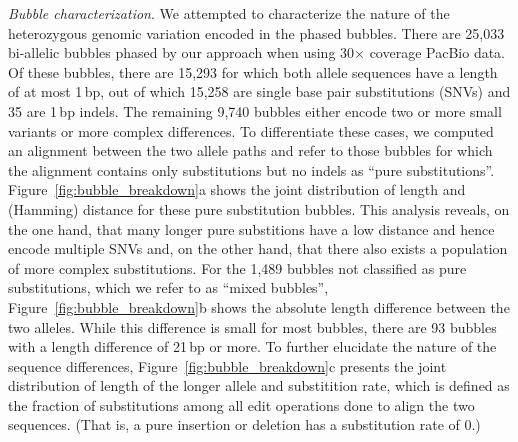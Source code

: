 \textit{Bubble characterization}.
We attempted to characterize the nature of the heterozygous genomic variation encoded in the phased bubbles.
There are 25,033 bi-allelic bubbles phased by our approach when using 30$\times$ coverage PacBio data.
Of these bubbles, there are 15,293 for which both allele sequences have a length of at most 1\,bp, out of which 15,258 are single base pair substitutions (SNVs) and 35 are 1\,bp indels.
The remaining 9,740 bubbles either encode two or more small variants or more complex differences.
To differentiate these cases, we computed an alignment between the two allele paths and refer to those bubbles for which the alignment contains only substitutions but no indels as ``pure substitutions''.
Figure~\ref{fig:bubble_breakdown}a shows the joint distribution of length and (Hamming) distance for these pure substitution bubbles.
This analysis reveals, on the one hand, that many longer pure substitions have a low distance and hence encode multiple SNVs and, on the other hand, that there also exists a population of more complex substitutions.
For the 1,489 bubbles not classified as pure substitutions, which we refer to as ``mixed bubbles'', Figure~\ref{fig:bubble_breakdown}b shows the absolute length difference between the two alleles.
While this difference is small for most bubbles, there are 93 bubbles with a length difference of 21\,bp or more.
To further elucidate the nature of the sequence differences, Figure~\ref{fig:bubble_breakdown}c presents the joint distribution of length of the longer allele and substitition rate, which is defined as the fraction of substitutions among all edit operations done to align the two sequences. (That is, a pure insertion or deletion has a substitution rate of 0.)


